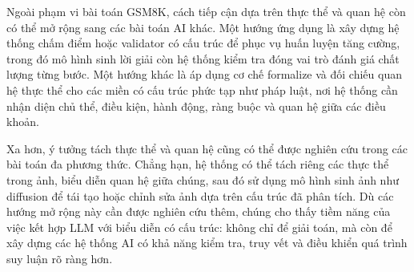 \documentclass[12pt,a4paper]{article}
\begin{document}
Ngoài phạm vi bài toán GSM8K, cách tiếp cận dựa trên thực thể và quan hệ còn có thể mở rộng sang các bài toán AI khác. Một hướng ứng dụng là xây dựng hệ thống chấm điểm hoặc validator có cấu trúc để phục vụ huấn luyện tăng cường, trong đó mô hình sinh lời giải còn hệ thống kiểm tra đóng vai trò đánh giá chất lượng từng bước. Một hướng khác là áp dụng cơ chế formalize và đối chiếu quan hệ thực thể cho các miền có cấu trúc phức tạp như pháp luật, nơi hệ thống cần nhận diện chủ thể, điều kiện, hành động, ràng buộc và quan hệ giữa các điều khoản.

Xa hơn, ý tưởng tách thực thể và quan hệ cũng có thể được nghiên cứu trong các bài toán đa phương thức. Chẳng hạn, hệ thống có thể tách riêng các thực thể trong ảnh, biểu diễn quan hệ giữa chúng, sau đó sử dụng mô hình sinh ảnh như diffusion để tái tạo hoặc chỉnh sửa ảnh dựa trên cấu trúc đã phân tích. Dù các hướng mở rộng này cần được nghiên cứu thêm, chúng cho thấy tiềm năng của việc kết hợp LLM với biểu diễn có cấu trúc: không chỉ để giải toán, mà còn để xây dựng các hệ thống AI có khả năng kiểm tra, truy vết và điều khiển quá trình suy luận rõ ràng hơn.


\end{document}
